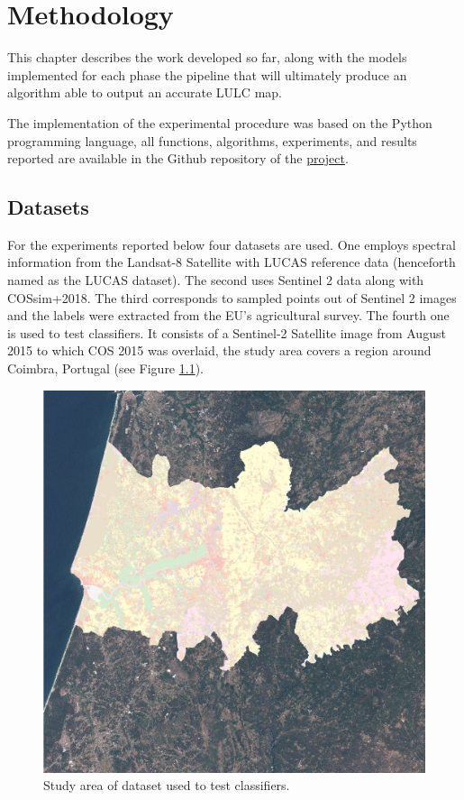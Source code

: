 \documentclass[12pt, english, openany]{book}
\begin{document}
\chapter{Methodology}

This chapter describes the work developed so far, along with the models
implemented for each phase the pipeline that will ultimately produce an
algorithm able to output an accurate LULC map.

The implementation of the experimental procedure was based on the Python
programming language, all functions, algorithms, experiments, and results
reported are available in the Github repository of the \href{https://github.com/joaopfonseca/remote_sensing}{project}.

\section{Datasets}

For the experiments reported below four datasets are used. One employs spectral
information from the Landsat-8 Satellite with LUCAS reference data (henceforth
named as the LUCAS dataset). The second uses Sentinel 2 data along with
COSsim+2018. The third corresponds to sampled points out of Sentinel 2 images
and the labels were extracted from the EU's agricultural survey. The fourth one
is used to test classifiers. It consists of a Sentinel-2 Satellite image from
August 2015 to which COS 2015 was overlaid, the study area covers a region
around Coimbra, Portugal (see Figure \ref{fig:sentinel2+cos2015}).

\begin{figure}[H]
	\centering
	\includegraphics[width=.7\linewidth]{sentinel2_cos.png}
  \caption{Study area of dataset used to test classifiers.}
  \label{fig:sentinel2+cos2015}
\end{figure}
\end{document}
